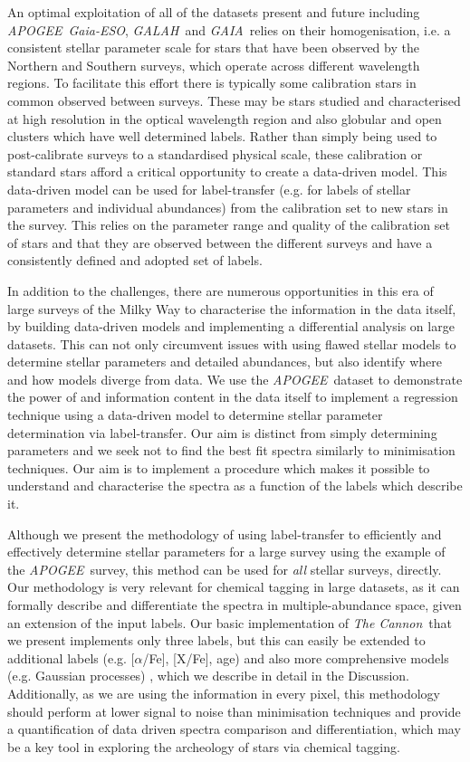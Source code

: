 \documentclass[12pt, preprint]{aastex}
\newcommand{\tc}{\textsl{The Cannon}}
\newcommand{\apogee}{\textsl{APOGEE}}
\newcommand{\galah}{\textsl{GALAH}}
\newcommand{\gaiaeso}{\textsl{Gaia-ESO}}
\newcommand{\gaia}{\textsl{GAIA}}
\begin{document}
An optimal exploitation of all of the datasets present and future including \apogee\, \gaiaeso, \galah\ and \gaia\ relies on their homogenisation, i.e. a consistent stellar parameter scale for stars that have been observed by the Northern and Southern surveys, which operate across different wavelength regions. To facilitate this effort there is typically some calibration stars in common observed between surveys. These may be stars studied and characterised at high resolution in the optical wavelength region and also globular and open clusters which have well determined labels. Rather than simply being used to post-calibrate surveys to a standardised physical scale, these calibration or standard stars afford a critical opportunity to create a data-driven model.  This data-driven model can be used for label-transfer (e.g. for labels of stellar parameters and individual abundances) from the calibration set to new stars in the survey. This relies on the parameter range and quality of the calibration set of stars and that they are observed between the different surveys and have a consistently defined and adopted set of labels. 

In addition to the challenges, there are numerous opportunities in this era of large surveys of the Milky Way to characterise the information in the data itself, by building data-driven models and implementing a differential analysis on large datasets. This can not only circumvent issues with using flawed stellar models to determine stellar parameters and detailed abundances, but also identify where and how models diverge from data. We use the \apogee\ dataset to demonstrate the power of and information content in the data itself to implement a regression technique using a data-driven model to determine stellar parameter determination via label-transfer. Our aim is distinct from simply determining parameters and we seek not to find the best fit spectra similarly to minimisation techniques. Our aim is to implement a procedure which makes it possible to understand and characterise the spectra as a function of the labels which describe it. 

Although we present the methodology of using label-transfer to efficiently and effectively determine stellar parameters for a large survey using the example of the \apogee\ survey, this method can be used for \textit{all} stellar surveys, directly.  Our methodology is very relevant for chemical tagging in large datasets, as it can formally describe and differentiate the spectra in multiple-abundance space, given an extension of the input labels.  Our basic implementation of \tc\ that we present implements only three labels, but this can easily be extended to additional labels  (e.g. [$\alpha$/Fe], [X/Fe], age) and also more comprehensive models (e.g. Gaussian processes) , which we describe in detail in the Discussion. Additionally, as we are using the information in every pixel, this methodology should perform at lower signal to noise than minimisation techniques and provide a quantification of data driven spectra comparison and differentiation, which may be a key tool in exploring the archeology of stars via chemical tagging. 
\end{document}
